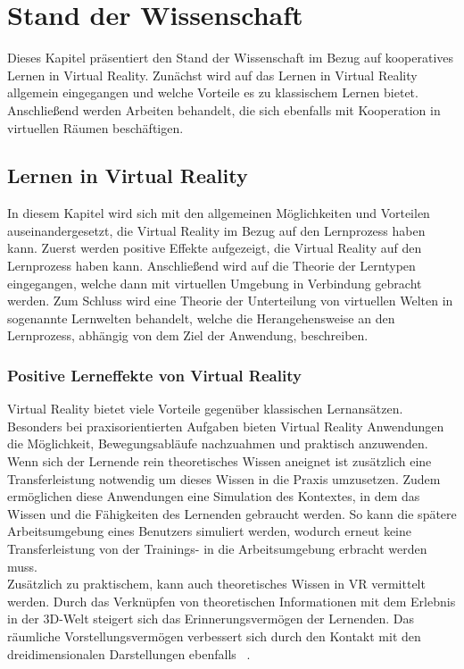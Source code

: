 \section{Stand der Wissenschaft} \label{Wissenschaft}
Dieses Kapitel präsentiert den Stand der Wissenschaft im Bezug auf kooperatives Lernen in Virtual Reality. Zunächst wird auf das Lernen in Virtual Reality allgemein eingegangen und welche Vorteile es zu klassischem Lernen bietet. Anschließend werden Arbeiten behandelt, die sich ebenfalls mit Kooperation in virtuellen Räumen beschäftigen.

\subsection{Lernen in Virtual Reality}
In diesem Kapitel wird sich mit den allgemeinen Möglichkeiten und Vorteilen auseinandergesetzt, die Virtual Reality im Bezug auf den Lernprozess haben kann. Zuerst werden positive Effekte aufgezeigt, die Virtual Reality auf den Lernprozess haben kann. Anschließend wird auf die Theorie der Lerntypen eingegangen, welche dann mit virtuellen Umgebung in Verbindung gebracht werden. Zum Schluss wird eine Theorie der Unterteilung von virtuellen Welten in sogenannte Lernwelten behandelt, welche die Herangehensweise an den Lernprozess, abhängig von dem Ziel der Anwendung, beschreiben.

\subsubsection{Positive Lerneffekte von Virtual Reality}
Virtual Reality bietet viele Vorteile gegenüber klassischen Lernansätzen. Besonders bei praxisorientierten Aufgaben bieten Virtual Reality Anwendungen die Möglichkeit, Bewegungsabläufe nachzuahmen und praktisch anzuwenden. Wenn sich der Lernende rein theoretisches Wissen aneignet ist zusätzlich eine Transferleistung notwendig um dieses Wissen in die Praxis umzusetzen. Zudem ermöglichen diese Anwendungen eine Simulation des Kontextes, in dem das Wissen und die Fähigkeiten des Lernenden gebraucht werden. So kann die spätere Arbeitsumgebung eines Benutzers simuliert werden, wodurch erneut keine Transferleistung von der Trainings- in die Arbeitsumgebung erbracht werden muss.\\

Zusätzlich zu praktischem, kann auch theoretisches Wissen in VR vermittelt werden. Durch das Verknüpfen von theoretischen Informationen mit dem Erlebnis in der 3D-Welt steigert sich das Erinnerungsvermögen der Lernenden. Das räumliche Vorstellungsvermögen verbessert sich durch den Kontakt mit den dreidimensionalen Darstellungen ebenfalls ~\parencite{Buehler2020}.\\

